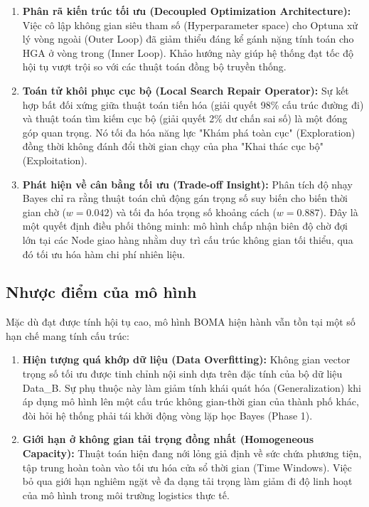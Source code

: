\documentclass[twoside,12pt]{article}
\begin{document}
\begin{enumerate}
    \item \textbf{Phân rã kiến trúc tối ưu (Decoupled Optimization Architecture):} Việc cô lập không gian siêu tham số (Hyperparameter space) cho Optuna xử lý vòng ngoài (Outer Loop) đã giảm thiểu đáng kể gánh nặng tính toán cho HGA ở vòng trong (Inner Loop). Khảo hướng này giúp hệ thống đạt tốc độ hội tụ vượt trội so với các thuật toán đồng bộ truyền thống.

    \item \textbf{Toán tử khôi phục cục bộ (Local Search Repair Operator):} Sự kết hợp bất đối xứng giữa thuật toán tiến hóa (giải quyết 98\% cấu trúc đường đi) và thuật toán tìm kiếm cục bộ (giải quyết 2\% dư chấn sai số) là một đóng góp quan trọng. Nó tối đa hóa năng lực "Khám phá toàn cục" (Exploration) đồng thời không đánh đổi thời gian chạy của pha "Khai thác cục bộ" (Exploitation).

    \item \textbf{Phát hiện về cân bằng tối ưu (Trade-off Insight):} Phân tích độ nhạy Bayes chỉ ra rằng thuật toán chủ động gán trọng số suy biến cho biến thời gian chờ ($w = 0.042$) và tối đa hóa trọng số khoảng cách ($w = 0.887$). Đây là một quyết định điều phối thông minh: mô hình chấp nhận biên độ chờ đợi lớn tại các Node giao hàng nhằm duy trì cấu trúc không gian tối thiểu, qua đó tối ưu hóa hàm chi phí nhiên liệu.
\end{enumerate}

\subsection{Nhược điểm của mô hình}
Mặc dù đạt được tính hội tụ cao, mô hình BOMA hiện hành vẫn tồn tại một số hạn chế mang tính cấu trúc:

\begin{enumerate}
    \item \textbf{Hiện tượng quá khớp dữ liệu (Data Overfitting):} Không gian vector trọng số tối ưu được tinh chỉnh nội sinh dựa trên đặc tính của bộ dữ liệu Data\_B. Sự phụ thuộc này làm giảm tính khái quát hóa (Generalization) khi áp dụng mô hình lên một cấu trúc không gian-thời gian của thành phố khác, đòi hỏi hệ thống phải tái khởi động vòng lặp học Bayes (Phase 1).

    \item \textbf{Giới hạn ở không gian tải trọng đồng nhất (Homogeneous Capacity):} Thuật toán hiện đang nới lỏng giả định về sức chứa phương tiện, tập trung hoàn toàn vào tối ưu hóa cửa sổ thời gian (Time Windows). Việc bỏ qua giới hạn nghiêm ngặt về đa dạng tải trọng làm giảm đi độ linh hoạt của mô hình trong môi trường logistics thực tế.
\end{enumerate}
\end{document}
